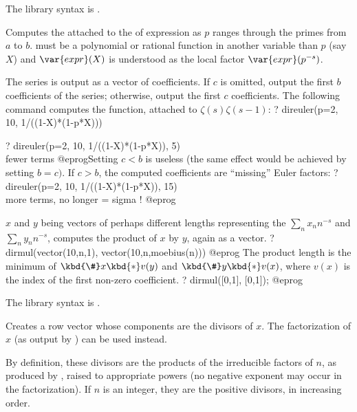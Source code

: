 The library syntax is .

\label{se:direuler}
Computes the  attached to the
 of expression  as $p$ ranges through the primes
from $a$
to $b$.  must be a polynomial or rational function in another
variable than $p$ (say $X$) and $\var{expr}(X)$ is understood as the local
factor $\var{expr}(p^{-s})$.

The series is output as a vector of coefficients. If $c$ is omitted, output
the first $b$ coefficients of the series; otherwise, output the first $c$
coefficients. The following command computes the  function,
attached to $\zeta(s)\zeta(s-1)$:
\bprog
? direuler(p=2, 10, 1/((1-X)*(1-p*X)))

? direuler(p=2, 10, 1/((1-X)*(1-p*X)), 5) \\ fewer terms
@eprog\noindent Setting $c < b$ is useless (the same effect would be
achieved by setting $b = c)$. If $c > b$, the computed coefficients are
``missing'' Euler factors:
\bprog
? direuler(p=2, 10, 1/((1-X)*(1-p*X)), 15) \\ more terms, no longer = sigma !
@eprog


\label{se:dirmul}
$x$ and $y$ being vectors of perhaps different lengths representing
the  $\sum_n x_n n^{-s}$ and $\sum_n y_n n^{-s}$,
computes the product of $x$ by $y$, again as a vector.
\bprog
? dirmul(vector(10,n,1), vector(10,n,moebius(n)))
@eprog\noindent
The product
length is the minimum of $\kbd{\#}x\kbd{*}v(y)$ and $\kbd{\#}y\kbd{*}v(x)$,
where $v(x)$ is the index of the first non-zero coefficient.
\bprog
? dirmul([0,1], [0,1]);
@eprog

The library syntax is .

\label{se:divisors}
Creates a row vector whose components are the
divisors of $x$. The factorization of $x$ (as output by ) can
be used instead.

By definition, these divisors are the products of the irreducible
factors of $n$, as produced by , raised to appropriate
powers (no negative exponent may occur in the factorization). If $n$ is
an integer, they are the positive divisors, in increasing order.

